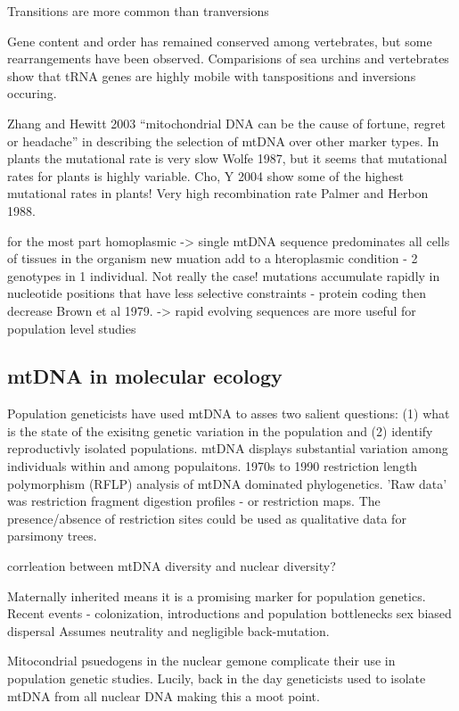 \documentclass{report}\usepackage[]{graphicx}\usepackage[]{color}
\begin{document}
Transitions are more common than tranversions


Gene content and order has remained conserved among vertebrates, but some rearrangements have
been observed. Comparisions of sea urchins and vertebrates show that tRNA genes are highly mobile with 
tanspositions and inversions occuring.  

Zhang and Hewitt 2003 ``mitochondrial DNA can be the cause of fortune, regret or headache'' in describing
the selection of mtDNA over other marker types. In plants the mutational rate is very slow Wolfe 1987, but 
it seems that mutational rates for plants is highly variable. Cho, Y 2004 show some of the highest mutational
rates in plants! Very high recombination rate Palmer and Herbon 1988.



for the most part homoplasmic -> single mtDNA sequence predominates all cells of tissues in the 
organism
new muation add to a hteroplasmic condition - 2 genotypes in 1 individual. Not really the case!
mutations accumulate rapidly in nucleotide positions that have less selective constraints - protein coding
then decrease Brown et al 1979. -> rapid evolving sequences are more useful for population level studies


\subsection*{mtDNA in molecular ecology}


Population geneticists have used mtDNA to asses two salient questions: (1) what is the 
state of the exisitng genetic variation in the population and (2) identify reproductivly isolated
populations. mtDNA displays substantial variation among individuals within and among 
populaitons. 1970s to 1990 restriction length polymorphism (RFLP)
analysis of mtDNA dominated phylogenetics. 'Raw data' was restriction fragment 
digestion profiles - or restriction maps.
The presence/absence of restriction sites could be used as qualitative data for parsimony trees. 

corrleation between mtDNA diversity and nuclear diversity?

Maternally inherited means it is a 
promising marker for population genetics. Recent events - colonization, introductions and population bottlenecks
sex biased dispersal
Assumes neutrality and negligible back-mutation. 


Mitocondrial psuedogens in the nuclear gemone complicate their use in population genetic studies. Lucily, 
back in the day geneticists used to isolate mtDNA from all nuclear DNA making this a moot point.  
\end{document}
